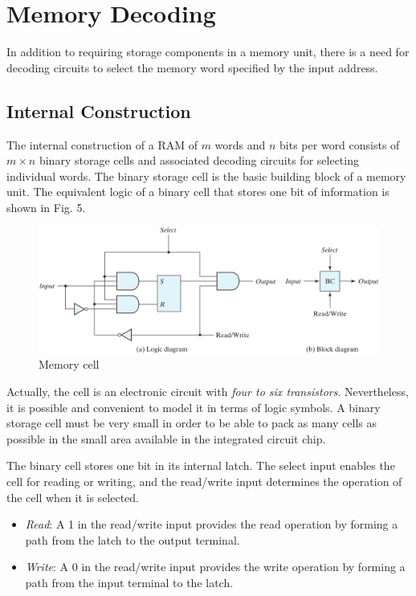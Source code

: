 \section{Memory Decoding}
\label{sec:memory-decoding}

In addition to requiring storage components in a memory unit, there is a need for decoding circuits to select the memory word specified by the input address.

\subsection{Internal Construction}
\label{subsec:internal-construction}

The internal construction of a RAM of $m$ words and $n$ bits per word consists of $m \times n$ binary storage cells and associated decoding circuits for selecting individual words. The binary storage cell is the basic building block of a memory unit. The equivalent logic of a binary cell that stores one bit of information is shown in Fig. 5.
\begin{figure}[H]
  \centering
  \includegraphics[width=\linewidth]{img/fig-7.5.png}
  \caption{Memory cell}
  \label{fig:7.5}
\end{figure}

Actually, the cell is an electronic circuit with \textit{four to six transistors}. Nevertheless, it is possible and convenient to model it in terms of logic symbols. A binary storage cell must be very small in order to be able to pack as many cells as possible in the small area available in the integrated circuit chip. 

The binary cell stores one bit in its internal latch. The select input enables the cell for reading or writing, and the read/write input determines the operation of the cell when it is selected.
\begin{itemize}
  \item \textit{Read}: A 1 in the read/write input provides the read operation by forming a path from the latch to the output terminal.
  \item \textit{Write}: A 0 in the read/write input provides the write operation by forming a path from the input terminal to the latch.
\end{itemize}

